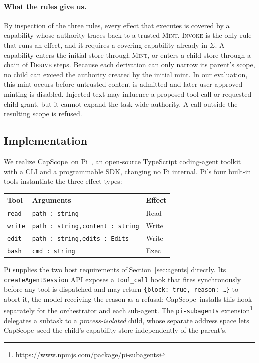 \documentclass[sigplan,review,anonymous]{acmart}
\newcommand{\tool}{CapScope\xspace}
\newcommand{\rulename}[1]{\textsc{#1}}
\begin{document}
  \paragraph{What the rules give us.}
  By inspection of the three rules, every effect that executes is covered by a
  capability whose authority traces back to a trusted \rulename{Mint}.
  \rulename{Invoke} is the only rule that runs an effect, and it requires a
  covering capability already in $\Sigma$. A capability enters the initial
  store through \rulename{Mint}, or enters a child store through a chain of
  \rulename{Derive} steps. Because each derivation can only narrow its parent's
  scope, no child can exceed the authority created by the initial mint. In our
  evaluation, this mint occurs before untrusted content is admitted and later
  user-approved minting is disabled. Injected text may influence a proposed
  tool call or requested child grant, but it cannot expand the task-wide
  authority. A call outside the resulting scope is refused.

  \subsection{Implementation}
  \label{sec:pattern}
  We realize \tool\ on Pi~\cite{pi2025}, an open-source TypeScript coding-agent
  toolkit with a CLI and a programmable SDK, changing no Pi internal. Pi's four
  built-in tools instantiate the three effect types:

  \begin{center}
  \small
  \setlength{\tabcolsep}{5pt}
  \begin{tabular}{@{} l p{3.6cm} l @{}}
  \toprule
  \textbf{Tool} & \textbf{Arguments} & \textbf{Effect} \\
  \midrule
  \texttt{read}
    & \texttt{path : string}
    & \textsf{Read}  \\
  \texttt{write}
    & \texttt{path : string,\newline content : string}
    & \textsf{Write} \\
  \texttt{edit}
    & \texttt{path : string,\newline edits : Edits}
    & \textsf{Write} \\
  \texttt{bash}
    & \texttt{cmd : string}
    & \textsf{Exec}  \\
  \bottomrule
  \end{tabular}
  \end{center}

  Pi supplies the two host requirements of Section~\ref{sec:agents} directly.
  Its \texttt{createAgentSession} API exposes a \texttt{tool\_call} hook that
  fires synchronously before any tool is dispatched and may return
  \texttt{\{block: true, reason: \ldots\}} to abort it, the model receiving the
  reason as a refusal; \tool\ installs this hook separately for the orchestrator
  and each sub-agent. The \texttt{pi-subagents}
  extension\footnote{\url{https://www.npmjs.com/package/pi-subagents}} delegates
  a subtask to a \emph{process-isolated} child, whose separate address space
  lets \tool\ seed the child's capability store independently of the parent's.
\end{document}
